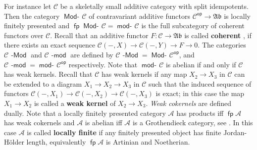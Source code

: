\documentclass[oneside, a4paper,reqno]{amsart}
\numberwithin{equation}{section}
\theoremstyle{definition}
\begin{document}
For instance let  ${\mathscr C}$ be a skeletally small additive category with
split idempotents.  Then the category $\operatorname*{\mathsf{Mod}-\!}{\mathscr C}$ of contravariant
additive functors ${\mathscr C}^\operatorname*{\mathsf{op}} {\longrightarrow} {\mathfrak{Ab}}$ is locally finitely presented
and $\operatorname*{\mathsf{fp}}\operatorname*{\mathsf{Mod}-\!}{\mathscr C} = \operatorname*{\mathsf{mod}-\!}{\mathscr C}$ is the full subcategory of coherent
functors over ${\mathscr C}$. Recall that an additive functor $F \colon {\mathscr C} \to
{\mathfrak{Ab}}$ is called {\bf coherent} \cite{Auslander:coherent}, if there
exists an exact sequence ${\mathscr C}(-,X) {\longrightarrow} {\mathscr C}(-,Y) {\longrightarrow} F {\longrightarrow} 0$. The
categories ${\mathscr C}\operatorname*{\!-\mathsf{Mod}}$ and ${\mathscr C}\operatorname*{\!-\mathsf{mod}}$ are defined by ${\mathscr C}\operatorname*{\!-\mathsf{Mod}} = \operatorname*{\mathsf{Mod}-\!}{\mathscr C}^\operatorname*{\mathsf{op}}$,
and ${\mathscr C}\operatorname*{\!-\mathsf{mod}} = \operatorname*{\mathsf{mod}-\!}{\mathscr C}^\operatorname*{\mathsf{op}}$ respectively. Note that $\operatorname*{\mathsf{mod}-\!}{\mathscr C}$ is abelian if
and only if ${\mathscr C}$ has weak kernels. Recall that ${\mathscr C}$ has weak kernels
if any map $X_{2} {\longrightarrow} X_{3}$ in ${\mathscr C}$ can be extended to a diagram
$X_{1} {\longrightarrow} X_{2} {\longrightarrow} X_{3}$ in ${\mathscr C}$ such that the induced sequence
of functors ${\mathscr C}(-,X_{1}) {\longrightarrow} {\mathscr C}(-,X_{2}) {\longrightarrow} {\mathscr C}(-,X_{3})$ is
exact; in this case the map $X_{1} {\longrightarrow} X_{2}$ is called a {\bf weak
kernel} of $X_{2} {\longrightarrow} X_{3}$. {\em Weak cokernels} are defined
dually. Note that a locally finitely presented category ${\mathscr A}$ has
products iff $\operatorname*{\mathsf{fp}}{\mathscr A}$ has weak cokernels and  ${\mathscr A}$ is abelian iff
${\mathscr A}$ is a Grothendieck category, see \cite{WCB}. In this case ${\mathscr A}$
is called {\bf locally finite} if  any finitely presented object has
finite Jordan-H\"{o}lder length, equivalently $\operatorname*{\mathsf{fp}} {\mathscr A}$ is Artinian
and Noetherian.
\end{document}
